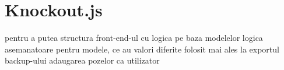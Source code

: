 \section{Knockout.js}
	pentru a putea structura front-end-ul cu logica pe baza modelelor
	logica asemanatoare pentru modele, ce au valori diferite
	folosit mai ales la
		exportul backup-ului
		adaugarea pozelor ca utilizator
